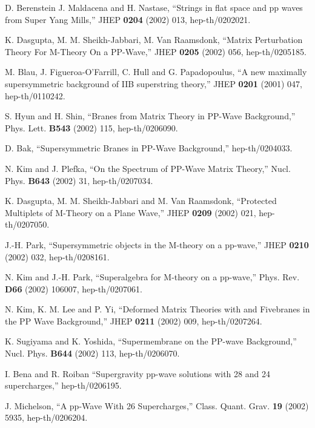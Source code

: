 \documentclass[a4paper,12pt]{article}
\numberwithin{equation}{section}
\begin{document}
\begin{thebibliography}{99}

 D. Berenstein J. Maldacena and H. Nastase, ``Strings
  in flat space and pp waves from \coordHE{} Super Yang Mills,''
  JHEP {\bf 0204} (2002) 013, hep-th/0202021.

 K. Dasgupta, M. M. Sheikh-Jabbari, M. Van Raamsdonk,
  ``Matrix Perturbation Theory For M-Theory On a PP-Wave,'' JHEP {\bf
    0205} (2002) 056, hep-th/0205185.

 M. Blau, J. Figueroa-O'Farrill, C. Hull and G.
  Papadopoulus, ``A new maximally supersymmetric background of IIB
  superstring theory,'' JHEP {\bf 0201} (2001) 047, hep-th/0110242.

 S. Hyun and H. Shin, ``Branes from Matrix Theory in
  PP-Wave Background,'' Phys. Lett. {\bf B543} (2002) 115,
  hep-th/0206090.

 D. Bak, ``Supersymmetric Branes in PP-Wave
  Background,'' hep-th/0204033.

 N. Kim and J. Plefka, ``On the Spectrum of PP-Wave
  Matrix Theory,'' Nucl. Phys. {\bf B643} (2002) 31, hep-th/0207034.

 K. Dasgupta, M. M. Sheikh-Jabbari and M. Van
  Raamsdonk, ``Protected Multiplets of M-Theory on a Plane Wave,''
  JHEP {\bf 0209} (2002) 021, hep-th/0207050.

 J.-H. Park, ``Supersymmetric objects in the M-theory
  on a pp-wave,'' JHEP {\bf 0210} (2002) 032, hep-th/0208161.

 N. Kim and J.-H. Park, ``Superalgebra for M-theory on
  a pp-wave,'' Phys. Rev. {\bf D66} (2002) 106007, hep-th/0207061.

 N. Kim, K. M. Lee and P. Yi, ``Deformed Matrix
  Theories with \coordHE{} and Fivebranes in the PP Wave
  Background,'' JHEP {\bf 0211} (2002) 009, hep-th/0207264.

 K. Sugiyama and K. Yoshida, ``Supermembrane on the
  PP-wave Background,'' Nucl. Phys. {\bf B644} (2002) 113,
  hep-th/0206070.

 I. Bena and R. Roiban ``Supergravity pp-wave
  solutions with 28 and 24 supercharges,'' hep-th/0206195.

 J. Michelson, ``A pp-Wave With 26 Supercharges,''
  Class. Quant. Grav. {\bf 19} (2002) 5935, hep-th/0206204.


\end{thebibliography}
\end{document}
